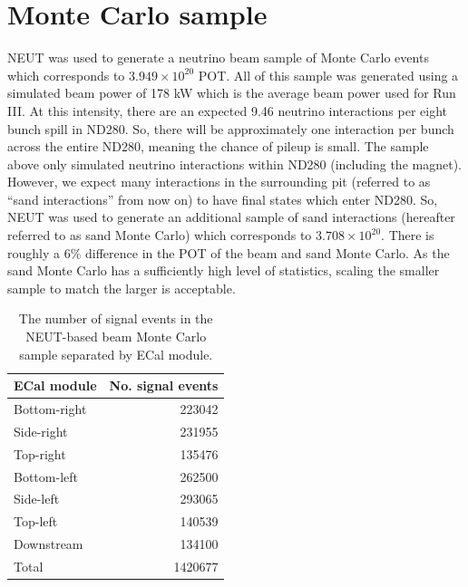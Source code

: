\section{Monte Carlo sample}
\label{sec:MonteCarloSample}
NEUT was used to generate a neutrino beam sample of Monte Carlo events which corresponds to $3.949\times10^{20}$ POT.  All of this sample was generated using a simulated beam power of 178 kW which is the average beam power used for Run III.  At this intensity, there are an expected 9.46 neutrino interactions per eight bunch spill in ND280.  So, there will be approximately one interaction per bunch across the entire  ND280, meaning the chance of pileup is small. 
\newline
\newline
The sample  above only simulated neutrino interactions within ND280 (including the  magnet).  However, we expect many interactions in the surrounding pit (referred to as ``sand interactions'' from now on) to have final states which enter ND280.  So, NEUT was used to generate an additional sample of sand interactions (hereafter referred to as sand Monte Carlo) which corresponds to $3.708\times10^{20}$.  There is roughly a 6$\%$ difference in the POT of the beam and sand Monte Carlo.  As the sand Monte Carlo has a sufficiently high level of statistics, scaling the smaller sample to match the larger is acceptable.
\newline
\newline
\begin{table}
  \begin{tabular}{ l r }
    ECal module & No. signal events \\ \hline \hline
    Bottom-right & 223042 \\
    Side-right & 231955 \\
    Top-right & 135476 \\
    Bottom-left & 262500 \\
    Side-left & 293065 \\
    Top-left & 140539 \\
    Downstream & 134100 \\
    \hline
    Total & 1420677 \\
  \end{tabular}
  \caption{The number of signal events in the NEUT-based beam Monte Carlo sample separated by ECal module.}
  \label{table:NSignalEventsTruth}
\end{table}
